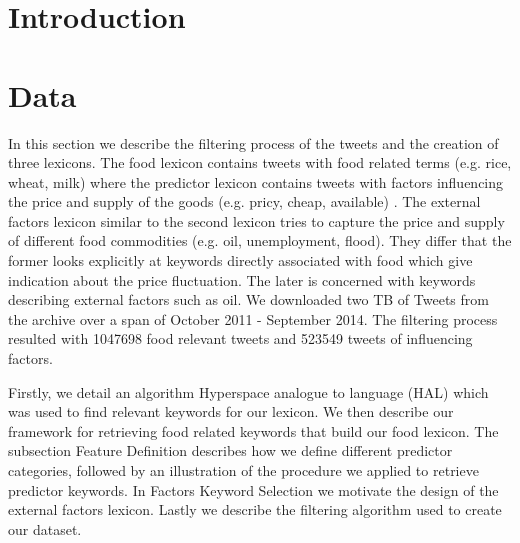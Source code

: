 \documentclass[12pt]{report}
\begin{document}
\setcounter{page}{1}
\chapter{Introduction}















\chapter{Data}
In this section we describe the filtering process of the tweets and the creation of three lexicons. The food lexicon contains tweets with food related terms (e.g. rice, wheat, milk) where the predictor lexicon contains tweets with factors influencing the price and supply of the goods (e.g. pricy, cheap, available) . The external factors lexicon similar to the second lexicon tries to capture the price and supply of different food commodities (e.g. oil, unemployment, flood). They differ that the former looks explicitly at keywords directly associated with food which give indication about the price fluctuation. The later is concerned with keywords describing external factors such as oil. We downloaded two TB of Tweets from the archive over a span of  October 2011 - September 2014.  The filtering process resulted with 1047698 food relevant tweets and 523549 tweets of influencing factors. 

Firstly, we detail an algorithm Hyperspace analogue to language (HAL)  \cite{lund96} which was used to find relevant keywords for our lexicon. We then describe our framework for retrieving food related keywords that build our food lexicon. The subsection Feature Definition describes how we define different predictor categories, followed by an illustration of the procedure we applied to retrieve predictor keywords. In Factors Keyword Selection we motivate the design of the external factors lexicon. Lastly we describe the filtering algorithm used to create our dataset. 
\end{document}
